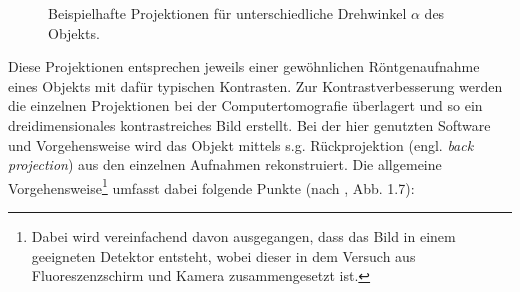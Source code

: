 \documentclass[11pt, a4paper]{article}
\numberwithin{equation}{section}
\begin{document}
\begin{figure}[ht]
\begin{subfigure}[c]{0.5\textwidth}
	\end{subfigure}
	\caption{Beispielhafte Projektionen für unterschiedliche Drehwinkel $\alpha$ des Objekts.}
	\label{fig:ct_projektionen}
\end{figure}
Diese Projektionen entsprechen jeweils einer gewöhnlichen Röntgenaufnahme eines Objekts mit dafür typischen Kontrasten.
Zur Kontrastverbesserung werden die einzelnen Projektionen bei der Computertomografie überlagert und so ein dreidimensionales kontrastreiches Bild erstellt.
Bei der hier genutzten Software und Vorgehensweise wird das Objekt mittels s.g. Rückprojektion (engl. \emph{back projection}) aus den einzelnen Aufnahmen rekonstruiert.
Die allgemeine Vorgehensweise\footnote{Dabei wird vereinfachend davon ausgegangen, dass das Bild in einem geeigneten Detektor entsteht, wobei dieser in dem Versuch aus Fluoreszenzschirm und Kamera zusammengesetzt ist.} umfasst dabei folgende Punkte (nach \cite{kalender}, Abb. 1.7):
\end{document}
